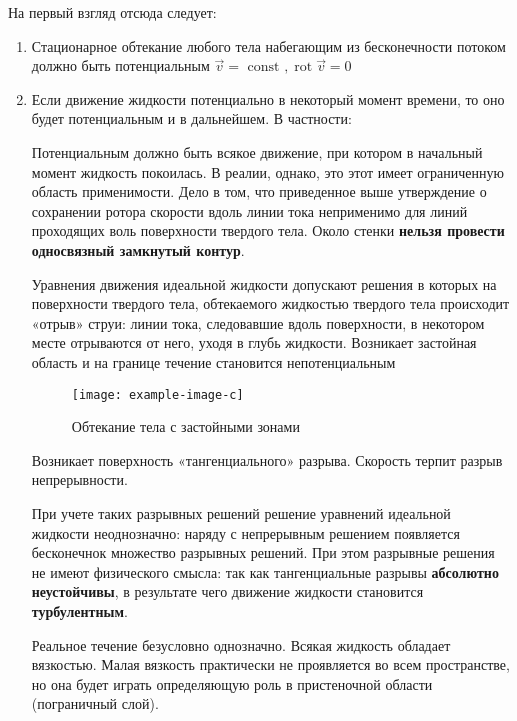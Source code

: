 На первый взгляд отсюда следует:
\begin{enumerate}
	\item Стационарное обтекание любого тела набегающим из бесконечности потоком должно быть потенциальным $\vec { v } = \text { const } ,\operatorname { rot } \vec { v } = 0$
	\item Если движение жидкости потенциально в некоторый момент времени, то оно будет потенциальным и в дальнейшем. В частности:

	Потенциальным должно быть всякое движение, при котором в начальный момент жидкость покоилась. В реалии, однако, это этот имеет ограниченную область применимости. Дело в том, что приведенное выше утверждение о сохранении ротора скорости вдоль линии тока неприменимо для линий проходящих воль поверхности твердого тела. Около стенки \textbf{нельзя провести односвязный замкнутый контур}. 

	Уравнения движения идеальной жидкости допускают решения в которых на поверхности твердого тела, обтекаемого жидкостью твердого тела происходит «отрыв» струи: линии тока, следовавшие вдоль поверхности, в некотором месте отрываются от него, уходя в глубь жидкости. Возникает застойная область и на границе течение становится непотенциальным 
	\begin{figure}[H]
		\centering
		\texttt{[image: example-image-c]}
		\caption{Обтекание тела с застойными зонами}
		\label{fig:figure14}
	\end{figure}
	Возникает поверхность «тангенциального» разрыва. Скорость терпит разрыв непрерывности.


	При учете таких разрывных решений решение уравнений идеальной жидкости неоднозначно: наряду с непрерывным решением появляется бесконечнок множество разрывных решений. При этом разрывные решения не имеют физического смысла: так как тангенциальные разрывы \textbf{абсолютно неустойчивы}, в результате чего движение жидкости становится \textbf{турбулентным}.

	Реальное течение безусловно однозначно. Всякая жидкость обладает вязкостью. Малая вязкость практически не проявляется во всем пространстве, но она будет играть определяющую роль в пристеночной области (пограничный слой).


\end{enumerate}
